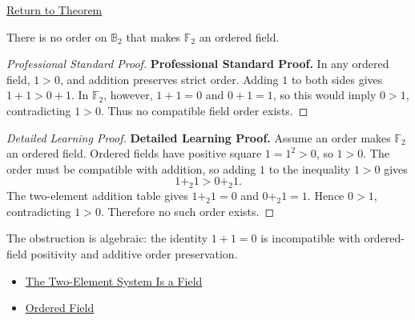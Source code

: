 \newpage
{}
\label{prf:two-element-system-not-ordered-field}

\begin{remark*}[Return]
\hyperref[thm:two-element-system-not-ordered-field]{Return to Theorem}
\end{remark*}

\begin{theorem*}
There is no order on \(\mathbb{B}_2\) that makes \(\mathbb{F}_2\) an ordered
field.
\end{theorem*}

\begin{proof}[Professional Standard Proof]
\LRAProofBodyStart
\textbf{Professional Standard Proof.}
In any ordered field, \(1>0\), and addition preserves strict order. Adding
\(1\) to both sides gives \(1+1>0+1\). In \(\mathbb{F}_2\), however,
\(1+1=0\) and \(0+1=1\), so this would imply \(0>1\), contradicting
\(1>0\). Thus no compatible field order exists.
\end{proof}

\begin{proof}[Detailed Learning Proof]
\LRAProofBodyStart
\textbf{Detailed Learning Proof.}
Assume an order makes \(\mathbb{F}_2\) an ordered field. Ordered fields have
positive square \(1=1^2>0\), so \(1>0\). The order must be compatible with
addition, so adding \(1\) to the inequality \(1>0\) gives
\[
1+_2 1 > 0+_2 1.
\]
The two-element addition table gives \(1+_2 1=0\) and \(0+_2 1=1\). Hence
\(0>1\), contradicting \(1>0\). Therefore no such order exists.
\end{proof}

\begin{remark*}
The obstruction is algebraic: the identity \(1+1=0\) is incompatible with
ordered-field positivity and additive order preservation.
\end{remark*}

\begin{dependencies}
\begin{itemize}
  \item \hyperref[thm:two-element-system-is-field]{The Two-Element System Is a Field}
  \item \hyperref[def:abstract-ordered-field]{Ordered Field}
\end{itemize}
\end{dependencies}

\clearpage
